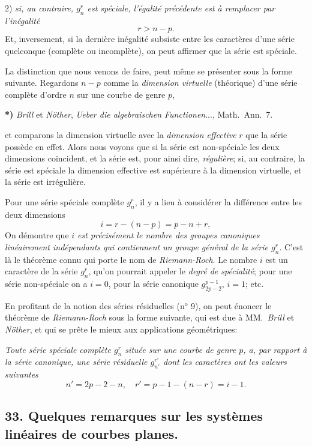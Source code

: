 \documentclass{article}
\begin{document}
2) \emph{si, au contraire, $g_{n}^{r}$ est spéciale, l'égalité précédente est à remplacer par l'inégalité}
\[ r > n - p. \]
Et, inversement, si la dernière inégalité subsiste entre les caractères d'une série quelconque (complète ou incomplète), on peut affirmer que la série est spéciale.

La distinction que nous venons de faire, peut même se présenter sous la forme suivante. Regardons $n - p$ comme la \emph{dimension virtuelle} (théorique) d'une série complète d'ordre $n$ sur une courbe de genre $p$,

\textbf{*)} \emph{Brill} et \emph{Nöther}, \emph{Ueber die algebraischen Functionen}..., Math.\ Ann.\ 7.

et comparons la dimension virtuelle avec la \emph{dimension effective} $r$ que la série possède en effet. Alors nous voyons que si la série est non-spéciale les deux dimensions coïncident, et la série est, pour ainsi dire, \emph{régulière}; si, au contraire, la série est spéciale la dimension effective est supérieure à la dimension virtuelle, et la série est irrégulière.

Pour une série spéciale complète $g_{n}^{r}$, il y a lieu à considérer la différence entre les deux dimensions
\[ i = r - (n-p) = p - n + r, \]
On démontre que \emph{$i$ est précisément le nombre des groupes canoniques linéairement indépendants qui contiennent un groupe général de la série $g_{n}^{r}$}. C'est là le théorème connu qui porte le nom de \emph{Riemann-Roch}. Le nombre $i$ est un caractère de la série $g_{n}^{r}$, qu'on pourrait appeler le \emph{degré de spécialité}; pour une série non-spéciale on a $i = 0$, pour la série canonique $g_{2p-2}^{p-1}$, $i = 1$; etc.

En profitant de la notion des séries résiduelles (n${}^{\text{o}}$ 9), on peut énoncer le théorème de \emph{Riemann-Roch} sous la forme suivante, qui est due à MM.\ \emph{Brill} et \emph{Nöther}, et qui se prête le mieux aux applications géométriques:

\emph{Toute série spéciale complète $g_{n}^{r}$ située sur une courbe de genre $p$, a, par rapport à la série canonique, une série résiduelle $g_{n'}^{r'}$ dont les caractères ont les valeurs suivantes}
\[ n' = 2p - 2 - n, \quad r' = p - 1 - (n-r) = i - 1. \]

\subsection*{33. Quelques remarques sur les systèmes linéaires de courbes planes.}
\end{document}
